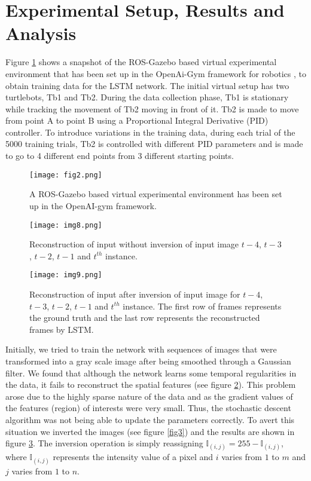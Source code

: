 \documentclass[sigconf]{acmart}
\begin{document}
\section{Experimental Setup, Results and Analysis}
Figure \ref{fig5} shows a snapshot of the ROS-Gazebo based virtual experimental environment that has been set up in the OpenAi-Gym framework for robotics \cite{openai}, to obtain training data for the LSTM network. The initial virtual setup has two turtlebots, Tb1 and Tb2. During the data collection phase, Tb1 is stationary while tracking the movement of Tb2 moving in front of it. Tb2 is made to move from point A to point B using a Proportional Integral Derivative (PID) controller. To introduce variations in the training data, during each trial of the 5000 training trials, Tb2 is controlled with different PID parameters and is made to go to 4 different end points from 3 different starting points.
\begin{figure}[t]
        \centering
        \texttt{[image: fig2.png]}

        \caption{A ROS-Gazebo based virtual experimental environment has been set up in the OpenAI-gym framework.}
        \label{fig5}
    \end{figure}\begin{figure}[h!]
        \centering
        \texttt{[image: img8.png]}

        \caption{Reconstruction of input without inversion of input image $t-4$, $t-3$, $t-2$, $t-1$ and $t^{th}$ instance.}
        \label{fig6}
    \end{figure}\begin{figure}[h!]
        \centering
        \texttt{[image: img9.png]}

        \caption{Reconstruction of input after inversion of input image for $t-4$, $t-3$, $t-2$, $t-1$ and $t^{th}$ instance. The first row of frames represents the ground truth and the last row represents the reconstructed frames by LSTM.}
        \label{fig7}
    \end{figure}%
Initially, we tried to train the network with sequences of images that were transformed into a gray scale image after being smoothed through a Gaussian filter. We found that although the network learns some temporal regularities in the data, it fails to reconstruct the spatial features (see figure \ref{fig6}). This problem arose due to the highly sparse nature of the data and as the gradient values of the features (region) of interests were very small. Thus, the stochastic descent algorithm was not being able to update the parameters correctly. To avert this situation we inverted the images (see figure \ref{fig3}) and the results are shown in figure \ref{fig7}. The inversion operation is simply reassigning $\mathbb{I}_{(i,j)}= 255-\mathbb{I}_{(i,j)}$, where $\mathbb{I}_{(i,j)}$ represents the intensity value of a pixel and $i$ varies from $1$ to $m$ and  $j$ varies from $1$ to $n$.
\end{document}
